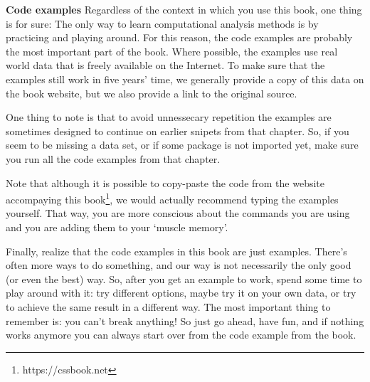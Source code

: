 \begin{feature}\textbf{Code examples}
Regardless of the context in which you use this book, one thing is for sure:
The only way to learn computational analysis methods is by practicing and playing around.
For this reason, the code examples are probably the most important part of the book.
Where possible, the examples use real world data that is freely available on the Internet.
To make sure that the examples still work in five years' time,
we generally provide a copy of this data on the book website,
but we also provide a link to the original source.

One thing to note is that to avoid unnessecary repetition
the examples are sometimes designed to continue on earlier
snipets from that chapter.
So, if you seem to be missing a data set, or if some package is not imported yet,
make sure you run all the code examples from that chapter.

Note that although it is possible to copy-paste the code from the website accompaying this book\footnote{https://cssbook.net},
we would actually recommend typing the examples yourself.
That way, you are more conscious about the commands you are using and you are adding them to your `muscle memory'.

Finally, realize that the code examples in this book are just examples.
There's often more ways to do something, and our way is not necessarily the only good (or even the best) way.
So, after you get an example to work, spend some time to play around with it:
try different options, maybe try it on your own data, or try to achieve the same result in a different way.
The most important thing to remember is: you can't break anything!
So just go ahead, have fun, and if nothing works anymore you can always start over from the code example from the book. 
\end{feature}

